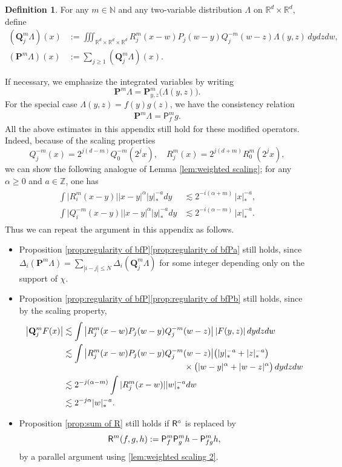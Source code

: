 \documentclass[10pt]{amsart}
\theoremstyle{plain}
\theoremstyle{definition}
\newtheorem{defn}[thm]{Definition}
\newcommand{\bfP}{\mathbf{P}}
\newcommand{\bfQ}{\mathbf{Q}}
\newcommand{\sfP}{\mathsf{P}}
\newcommand{\bbN}{\mathbb{N}}
\newcommand{\bbR}{\mathbb{R}}
\newcommand{\bbZ}{\mathbb{Z}}
\begin{document}
\begin{defn}
For any $m\in\bbN$ and any two-variable distribution $\Lambda$ on $\bbR^d\times\bbR^d$, define
\begin{align*}
(\bfQ_j^m \Lambda)(x) &:= \iiint_{\bbR^d\times\bbR^d\times\bbR^d} R_j^m(x-w)P_j(w-y)Q_j^{-m}(w-z) \Lambda(y,z)\,dydzdw, \\
(\bfP^m \Lambda)(x) &:= \sum_{j\ge1}(\bfQ_j^m\Lambda)(x).
\end{align*}
\end{defn}

If necessary, we emphasize the integrated variables by writing
\[
\bfP^m\Lambda =\bfP_{y,z}^m\bigl(\Lambda(y,z)\bigr).
\]
For the special case $\Lambda(y,z)=f(y)g(z)$, we have the consistency relation
\begin{align*}
\bfP^m\Lambda = {\sfP}^m_fg.
\end{align*}
All the above estimates in this appendix still hold for these modified operators. Indeed, because of the scaling properties
\[
Q_j^{-m}(x)=2^{j(d-m)}Q_0^{-m}(2^jx),\quad
R_j^m(x)=2^{j(d+m)}R_0^m(2^jx),
\]
we can show the following analogue of Lemma \ref{lem:weighted scaling}; for any $\alpha\ge0$ and $a\in\bbZ$, one has
\begin{align}\label{lem:weighted scaling 2}
\begin{aligned}
\int \big|R_i^m(x-y)\big| |x-y|^\alpha|y|_*^{-a}dy&\lesssim2^{-i(\alpha+m)}\,|x|_*^{-a}, \\
\int \big|Q_i^{-m}(x-y)\big| |x-y|^\alpha|y|_*^{-a}dy&\lesssim2^{-i(\alpha-m)}\,|x|_*^{-a}.
\end{aligned}
\end{align}
Thus we can repeat the argument in this appendix as follows.
\begin{itemize}
\item Proposition \ref{prop:regularity of bfP}\eqref{prop:regularity of bfPa} still holds, since $\Delta_i(\bfP^m\Lambda)=\sum_{|i-j|\le N}\Delta_i(\bfQ_j^m\Lambda)$ for some integer depending only on the support of $\chi$.
\item Proposition \ref{prop:regularity of bfP}\eqref{prop:regularity of bfPb} still holds, since by the scaling property,
\begin{align*}
\big|\bfQ_j^mF(x)\big| &\lesssim \int \big|R_j^m(x-w)P_j(w-y)Q_j^{-m}(w-z)\big| \,|F(y,z)|\, dydzdw \\
&\lesssim \int \big|R_j^m(x-w)P_j(w-y)Q_j^{-m}(w-z)\big| \bigl(|y|_*^{-a}+|z|_*^{-a}\bigr)\\[-5pt]
& \hspace*{5cm}\times\bigl(|w-y|^\alpha+|w-z|^\alpha\bigr) \,dydzdw \\
&\lesssim 2^{-j(\alpha-m)}\int |R_j^m(x-w)| |w|_*^{-a}dw\\
&\lesssim 2^{-j\alpha}|w|_*^{-a}.
\end{align*}

\item Proposition \ref{prop:sum of R} still holds if ${\sf R}^{\circ}$ is replaced by
\[
{\sf R}^m(f,g,h):={\sf P}_f^m{\sf P}^m_gh-{\sf P}^m_{fg}h,
\]
by a parallel argument using \eqref{lem:weighted scaling 2}.
\end{itemize}
\end{document}
